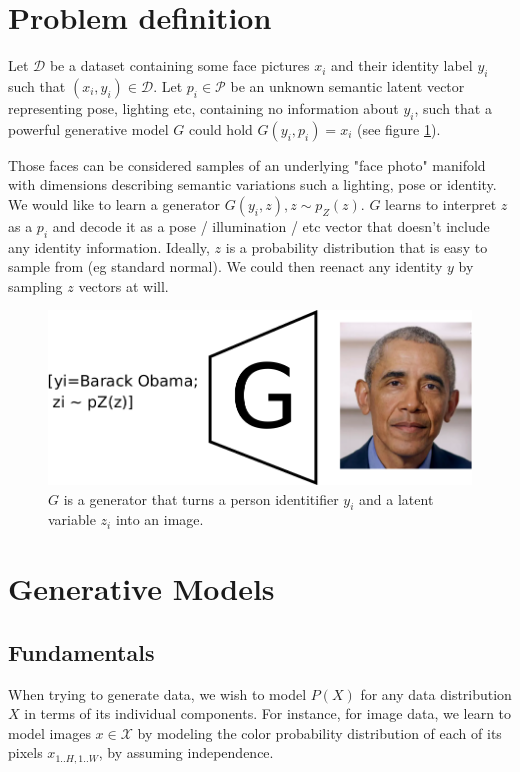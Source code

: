 \section{Problem definition}

Let $\mathcal{D}$ be a dataset containing some face pictures $x_i$ and their identity label $y_i$ such that $(x_i, y_i) \in\mathcal{D}$. Let $p_i \in \mathcal{P}$ be an unknown semantic latent vector representing pose, lighting etc, containing no information about $y_i$, such that a powerful generative model $G$ could hold $G(y_i, p_i) = x_i$ (see figure \ref{fig:G_specs}).

Those faces can be considered samples of an underlying "face photo" manifold with dimensions describing semantic variations such a lighting, pose or identity. We would like to learn a generator $G(y_i, z), z \sim p_Z(z)$. $G$ learns to interpret $z$ as a $p_i$ and decode it as a pose / illumination / etc vector that doesn't include any identity information. Ideally, $z$ is a probability distribution that is easy to sample from (eg standard normal). We could then reenact any identity $y$ by sampling $z$ vectors at will.

\begin{figure}[ht]
    \centering
    \includegraphics[scale=0.5]{60-files/GANVAE-1-1}
    \caption{$G$ is a generator that turns a person identitifier $y_i$ and a latent variable $z_i$ into an image.}
    \label{fig:G_specs}
\end{figure}

\section{Generative Models}
\subsection{Fundamentals}
When trying to generate data, we wish to model $P(X)$ for any data distribution $X$ in terms of its individual components. For instance, for image data, we learn to model images $x \in \mathcal{X}$ by modeling the color probability distribution of each of its pixels $x_{1..H, 1..W}$, by assuming independence.

